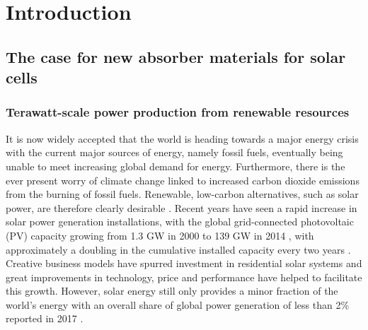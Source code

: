\documentclass[11pt, twoside]{report}
\begin{document}
\chapter{Introduction}
\setcounter{page}{1}

\section{The case for new absorber materials for solar cells}

\subsection{Terawatt-scale power production from renewable resources}

It is now widely accepted that the world is heading towards a major energy crisis with the current major sources of energy, namely fossil fuels, eventually being unable to meet increasing global demand for energy. Furthermore, there is the ever present worry of climate change linked to increased carbon dioxide emissions from the burning of fossil fuels. Renewable, low-carbon alternatives, such as solar power, are therefore clearly desirable \cite{PV_for_climate_change}. 
Recent years have seen a rapid increase in solar power generation installations, with the global grid-connected photovoltaic (PV) capacity growing from 1.3 GW in 2000 to 139 GW in 2014 \cite{pathways_129}, with approximately a doubling in the cumulative installed capacity every two years \cite{pathways}. Creative business models have spurred investment in residential solar systems \cite{MIT} and great improvements in technology, price and performance have helped to facilitate this growth. However, solar energy still only provides a minor fraction of the world's energy with an overall share of global power generation of less than 2\% reported in 2017 \cite{bp_solar}. %
\end{document}
